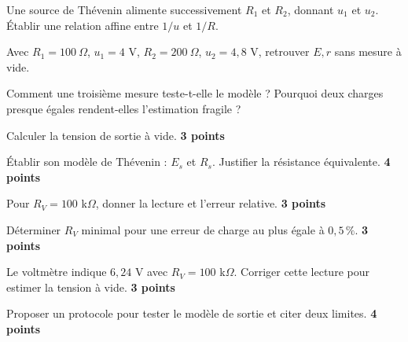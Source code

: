 \label{ex-D3}
\begin{questions}
\item Une source de Thévenin alimente successivement $R_1$ et $R_2$, donnant $u_1$ et $u_2$. Établir une relation affine entre $1/u$ et $1/R$.
\item Avec $R_1=100\ \Omega$, $u_1=4$ V, $R_2=200\ \Omega$, $u_2=4{,}8$ V, retrouver $E,r$ sans mesure à vide.
\item Comment une troisième mesure teste-t-elle le modèle ? Pourquoi deux charges presque égales rendent-elles l’estimation fragile ?
\end{questions}


\begin{questions}
\item Calculer la tension de sortie à vide. \textbf{3 points}
\item Établir son modèle de Thévenin : $E_s$ et $R_s$. Justifier la résistance équivalente. \textbf{4 points}
\item Pour $R_V=100$ k$\Omega$, donner la lecture et l’erreur relative. \textbf{3 points}
\item Déterminer $R_V$ minimal pour une erreur de charge au plus égale à $0{,}5\,\%$. \textbf{3 points}
\item Le voltmètre indique $6{,}24$ V avec $R_V=100$ k$\Omega$. Corriger cette lecture pour estimer la tension à vide. \textbf{3 points}
\item Proposer un protocole pour tester le modèle de sortie et citer deux limites. \textbf{4 points}
\end{questions}


